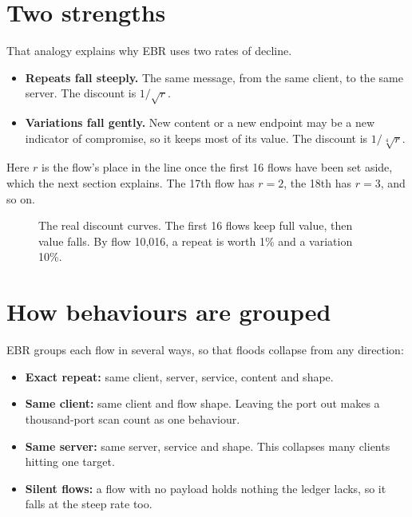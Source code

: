 \section{Two strengths}
That analogy explains why EBR uses two rates of decline.

\begin{itemize}
\item \textbf{Repeats fall steeply.} The same message, from the same client, to the same server. The discount is $1/\sqrt{r}$.
\item \textbf{Variations fall gently.} New content or a new endpoint may be a new indicator of compromise, so it keeps most of its value. The discount is $1/\sqrt[4]{r}$.
\end{itemize}
Here $r$ is the flow's place in the line once the first 16 flows have been set aside, which the next section explains. The 17th flow has $r=2$, the 18th has $r=3$, and so on.

\begin{figure}[H]
\centering
{}
\caption{The real discount curves. The first 16 flows keep full value, then value falls. By flow 10,016, a repeat is worth 1\% and a variation 10\%.}
\end{figure}

\section{How behaviours are grouped}
EBR groups each flow in several ways, so that floods collapse from any direction:
\begin{itemize}
\item \textbf{Exact repeat:} same client, server, service, content and shape.
\item \textbf{Same client:} same client and flow shape. Leaving the port out makes a thousand-port scan count as one behaviour.
\item \textbf{Same server:} same server, service and shape. This collapses many clients hitting one target.
\item \textbf{Silent flows:} a flow with no payload holds nothing the ledger lacks, so it falls at the steep rate too.
\end{itemize}

